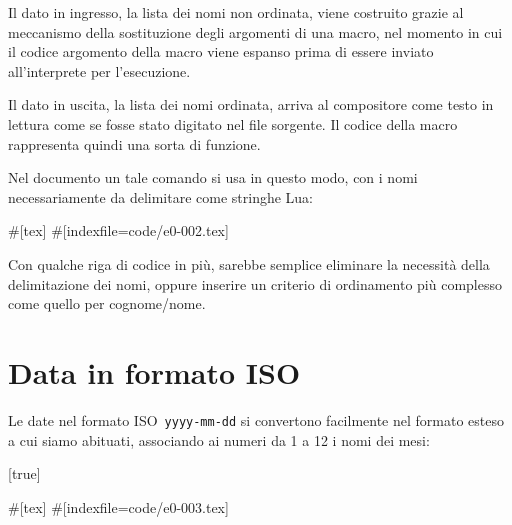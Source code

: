 Il dato in ingresso, la lista dei nomi non ordinata, viene costruito grazie al
meccanismo della sostituzione degli argomenti di una macro, nel momento in cui
il codice argomento della macro  viene espanso prima di essere
inviato all'interprete per l'esecuzione.

Il dato in uscita, la lista dei nomi ordinata, arriva al compositore come testo
in lettura come se fosse stato digitato nel file sorgente. Il codice della macro
 rappresenta quindi una sorta di funzione.

Nel documento un tale comando si usa in questo modo, con i nomi necessariamente
da delimitare come stringhe Lua:
\begin{lines}
#[tex]
#[indexfile=code/e0-002.tex]
\end{lines}

Con qualche riga di codice in più, sarebbe semplice eliminare la necessità della
delimitazione dei nomi, oppure inserire un criterio di ordinamento più complesso
come quello per cognome/nome.


\section{Data in formato ISO}

Le date nel formato ISO~\texttt{yyyy-mm-dd} si convertono facilmente nel formato
esteso a cui siamo abituati, associando ai numeri da 1 a 12 i nomi dei mesi:

[true]%
%
%
%
\begin{lines}
#[tex]
#[indexfile=code/e0-003.tex]
\newcommand{\isodate}[1]{\directlua{
local isodate = [[#1]]
local y = assert(math.tointeger(isodate:sub(1,4)))
local m = assert(math.tointeger(isodate:sub(6,7)))
local d = assert(math.tointeger(isodate:sub(9)))
local month = {
   "gennaio", "febbraio", "marzo", "aprile", "maggio",
   "giugno", "luglio", "agosto", "settembre", "ottobre",
   "novembre", "dicembre"
}
tex.print(d.." "..month[m].." "..y)
}}
\end{lines}

